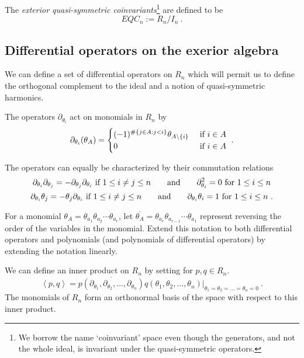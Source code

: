 \documentclass[11pt]{amsart}
\theoremstyle{definition}
\numberwithin{equation}{section}
\begin{document}
The \emph{exterior quasi-symmetric coinvariants}\footnote{We borrow
the name `coinvariant' space even though the generators, and not the whole ideal, is
invariant under the quasi-symmetric operators.} are defined to be
\[
EQC_n := R_n/I_n~.
\]


\subsection{Differential operators on the exerior algebra}\label{ssec:harm}
We can define a set of differential operators on $R_n$ which
will permit us to define the orthogonal complement to the
ideal and a notion of quasi-symmetric harmonics.

The operators $\partial_{\theta_i}$ act on monomials in $R_n$
by
\[
\partial_{\theta_i}( \theta_A ) = \begin{cases}
(-1)^{\#\{ j \in A: j<i\}}\theta_{A \backslash \{i\}}&\hbox{ if }i \in A\\
0&\hbox{ if }i \in A
\end{cases}~.
\]

The operators can equally be characterized by their commutation
relations
\[
\partial_{\theta_i} \partial_{\theta_j}=-\partial_{\theta_j} \partial_{\theta_i}
\hbox{ if } 1 \leq i \neq j \leq n
\qquad\hbox{and}\qquad
\partial_{\theta_i}^2 = 0\hbox{ for }1 \leq i \leq n
\]
\[
\partial_{\theta_i} \theta_j=-\theta_j \partial_{\theta_i}
\hbox{ if } 1 \leq i \neq j \leq n
\qquad\hbox{and}\qquad
\partial_{\theta_i} \theta_i = 1\hbox{ for }1 \leq i \leq n~.
\]

For a monomial $\theta_A = \theta_{a_1} \theta_{a_2} \cdots \theta_{a_r}$,
let $\overline{\theta_A} = \theta_{a_r} \theta_{a_{r-1}} \cdots \theta_{a_1}$ represent
reversing the order of the variables in the monomial.  Extend this notation to both
differential operators and polynomials (and polynomials of differential operators)
by extending the notation linearly.

We can define an inner product on $R_n$ by setting for $p,q \in R_n$.
\[
\left< p, q \right> = \overline{p(\partial_{\theta_1}, \partial_{\theta_2}, \ldots, \partial_{\theta_n})}
q( \theta_1, \theta_2, \ldots, \theta_n)|_{\theta_1=\theta_2 = \ldots=\theta_n=0}~.
\]
The monomials of $R_n$ form an orthonormal basis of the space with respect to this
inner product.
\end{document}
